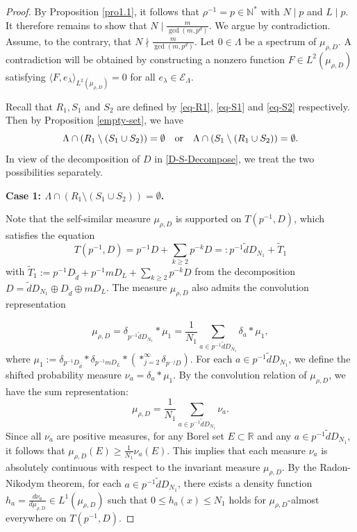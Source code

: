 \documentclass[11pt]{article}
\numberwithin{equation}{section}
\begin{document}
\begin{proof}
By Proposition \ref{pro1.1}, it follows that $\rho^{-1}=p\in\mathbb{N}^*$ with $N\mid p$ and $L\mid p$. It therefore remains to show that $N\mid\frac{m}{\gcd(m,p^d)}$. We argue by contradiction. Assume, to the contrary, that $N\nmid\frac{m}{\gcd(m,p^d)}$.  Let $0\in\Lambda$ be a spectrum of $\mu_{\rho,D}$. A contradiction will be obtained by constructing a nonzero function
$F \in L^2(\mu_{\rho,D})$ satisfying
$\langle F,e_{\lambda} \rangle_{L^2(\mu_{\rho,D})}=0$ for all $e_{\lambda}\in \mathcal{E}_\Lambda$. %

\medskip
Recall that $R_1, S_1$ and $S_2$ are defined by \eqref{eq-R1}, \eqref{eq-S1} and \eqref{eq-S2} respectively.
Then by Proposition  \ref{empty-set}, we have
$$
\Lambda\cap (R_1 \setminus (S_1\cup S_2))=\emptyset \quad {\rm{or}} \quad\Lambda\cap (S_1 \setminus (R_1\cup S_2))=\emptyset.
$$
In view of the decomposition of $D$ in \eqref{D-S-Decompose}, we treat the two possibilities separately.


\medskip
\textbf{Case 1: $\Lambda\cap (R_1 \setminus (S_1\cup S_2))=\emptyset$.}

Note that the self-similar measure $\mu_{\rho,D}$ is supported on $T(p^{-1},D)$, which satisfies the equation
$$T(p^{-1},D)=p^{-1}D +\sum_{k \ge 2}p^{-k}D =: p^{-1}\tilde{d}D_{N_1}+ \tilde{T}_1$$
with $\tilde{T}_1:= p^{-1}D_{\tilde{d}}+p^{-1}mD_{L}+\sum_{k \ge 2}p^{-k}D$ from the decomposition $D=\tilde{d}D_{N_1}\oplus D_{\tilde{d}}\oplus mD_{L}$. The measure $\mu_{\rho,D}$  also admits the convolution representation

\begin{equation*}
	\mu_{\rho,D} = \delta_{p^{-1}\tilde{d}D_{N_1}} \ast \mu_1 = \frac{1}{N_1} \sum_{a \in p^{-1}\tilde{d}D_{N_1}} \delta_a \ast \mu_1,
\end{equation*}
where $\mu_1:=\delta_{p^{-1}D_{\tilde{d}}} \ast \delta_{p^{-1} mD_{L}} \ast (\ast^{\infty}_{j=2} \delta_{p^{-j}D}).$
For each $a \in p^{-1}\tilde{d}D_{N_1}$, we define the shifted probability measure $\nu_a = \delta_a \ast \mu_1$. By the convolution relation of $\mu_{\rho,D}$, we have the sum representation:
\begin{equation*}
	\mu_{\rho,D} = \frac{1}{N_1} \sum_{a \in p^{-1}\tilde{d}D_{N_1}} \nu_a.
\end{equation*}
Since all $\nu_a$ are positive measures, for any Borel set $E \subset \mathbb{R}$ and any $a\in p^{-1}\tilde{d}D_{N_1}$, it follows that $\mu_{\rho,D}(E) \ge \frac{1}{N_1} \nu_a(E)$. This implies that each measure $\nu_a$ is absolutely continuous with respect to the invariant measure $\mu_{\rho,D}$.
By the Radon-Nikodym theorem, for each $a\in p^{-1}\tilde{d}D_{N_1}$, there exists a density function $h_a = \frac{d\nu_a}{d\mu_{\rho,D}} \in L^1(\mu_{\rho,D})$ such that $0 \le h_a(x) \le N_1$ holds for $\mu_{\rho,D}$-almost everywhere on $ T(p^{-1},D)$.


\end{proof}
\end{document}
